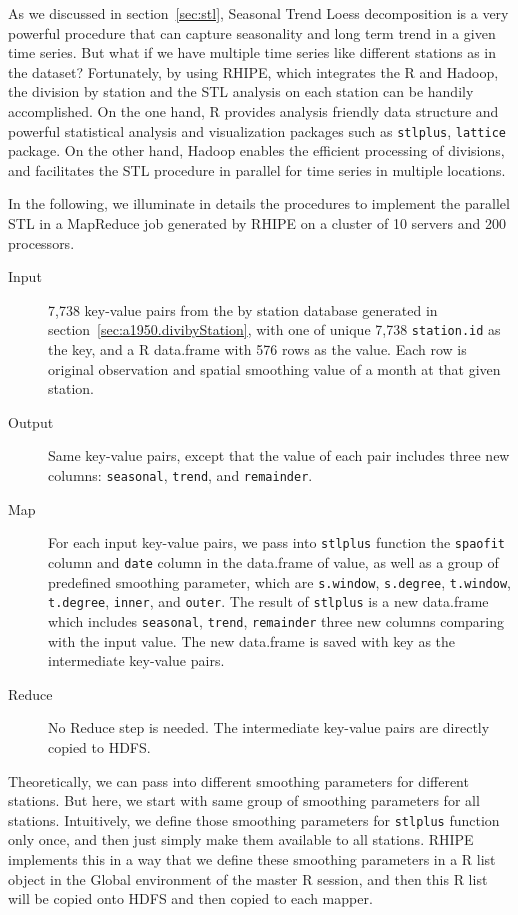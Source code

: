 As we discussed in section~\ref{sec:stl}, Seasonal Trend Loess decomposition is 
a very powerful procedure that can capture seasonality and long term trend in a
given time series. But what if we have multiple time series like different 
stations as in the dataset? Fortunately, by using RHIPE, which integrates the R 
and Hadoop, the division by station and the STL analysis on each station can be 
handily accomplished. On the one hand, R provides analysis friendly data structure 
and powerful statistical analysis and visualization packages such as 
\texttt{stlplus}, \texttt{lattice} package. On the other hand, Hadoop enables the
efficient processing of divisions, and facilitates the STL procedure in parallel
for time series in multiple locations. 

In the following, we illuminate in details the procedures to implement the parallel
STL in a MapReduce job generated by RHIPE on a cluster of 10 servers and 200 
processors.


\begin{description}
  \item[Input] 7,738 key-value pairs from the by station database generated in 
  section~\ref{sec:a1950.divibyStation}, with one of unique 7,738 
  \texttt{station.id} as the key, and a R data.frame with 576 rows as the value.
  Each row is original observation and spatial smoothing value of a month at 
  that given station. 
  \item[Output] Same key-value pairs, except that the value of each pair includes
  three new columns: \texttt{seasonal}, \texttt{trend}, and \texttt{remainder}.
  \item[Map] For each input key-value pairs, we pass into \texttt{stlplus}
  function the \texttt{spaofit} column and \texttt{date} column in the 
  data.frame of value, as well as a group of predefined smoothing parameter, 
  which are \texttt{s.window}, \texttt{s.degree}, \texttt{t.window}, 
  \texttt{t.degree}, \texttt{inner}, and \texttt{outer}. The result of 
  \texttt{stlplus} is a new data.frame which includes \texttt{seasonal}, 
  \texttt{trend}, \texttt{remainder} three new columns comparing with the input 
  value. The new data.frame is saved with key as the intermediate key-value pairs.
  \item[Reduce] No Reduce step is needed. The intermediate key-value pairs are 
  directly copied to HDFS.
\end{description}

Theoretically, we can pass into different smoothing parameters for different 
stations. But here, we start with same group of smoothing parameters for all 
stations. Intuitively, we define those smoothing parameters for \texttt{stlplus} 
function only once, and then just simply make them available to all stations. 
RHIPE implements this in a way that we define these smoothing parameters in a R 
list object in the Global environment of the master R session, and then this R 
list will be copied onto HDFS and then copied to each mapper.

